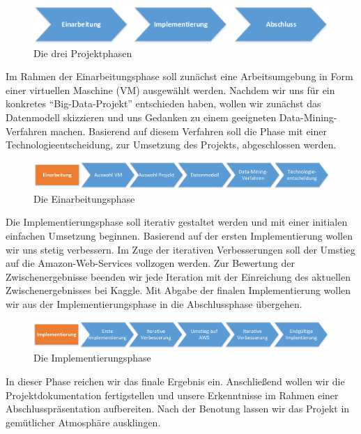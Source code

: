 \begin{figure}[H]
\centering
\includegraphics[width=0.8\linewidth]{Bilder/ProjektplanAllgemein}
\caption{Die drei Projektphasen}
\label{fig:ProjektplanAllgemein}
\end{figure}

Im Rahmen der Einarbeitungsphase soll zunächst eine Arbeitsumgebung in Form einer virtuellen Maschine (VM) ausgewählt werden. Nachdem wir uns für ein konkretes "`Big-Data-Projekt"' entschieden haben, wollen wir zunächst das Datenmodell skizzieren und uns Gedanken zu einem geeigneten Data-Mining-Verfahren machen. Basierend auf diesem Verfahren soll die Phase mit einer Technologieentscheidung, zur Umsetzung des Projekts, abgeschlossen werden.

\begin{figure}[h]
\centering
\includegraphics[width=1\linewidth]{Bilder/ProjektEinarbeitung}
\caption{Die Einarbeitungsphase}
\label{fig:ProjektEinarbeitung}
\end{figure}

Die Implementierungsphase soll iterativ gestaltet werden und mit einer initialen einfachen Umsetzung beginnen. Basierend auf der ersten Implementierung wollen wir uns stetig verbessern. Im Zuge der iterativen Verbesserungen soll der Umstieg auf die Amazon-Web-Services vollzogen werden. Zur Bewertung der Zwischenergebnisse beenden wir jede Iteration mit der Einreichung des aktuellen Zwischenergebnisses bei Kaggle. Mit Abgabe der finalen Implementierung wollen wir aus der Implementierungsphase in die Abschlussphase übergehen.

\begin{figure}[h]
\centering
\includegraphics[width=1\linewidth]{Bilder/ProjektImplementierung}
\caption{Die Implementierungsphase}
\label{fig:ProjektImplementierung}
\end{figure}

In dieser Phase reichen wir das finale Ergebnis ein. Anschließend wollen wir die Projektdokumentation fertigstellen und unsere Erkenntnisse im Rahmen einer Abschlusspräsentation aufbereiten. Nach der Benotung lassen wir das Projekt in gemütlicher Atmosphäre ausklingen.

